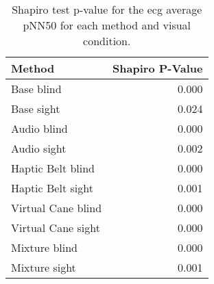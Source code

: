 
\begin{table}[!htb]
\centering
\caption{Shapiro test p-value for the ecg average pNN50 for each method and visual condition.}
\label{tab:shapiro_ecg_pnn50}
\begin{tabular}{lr}
\toprule
            Method &  Shapiro P-Value \\
\midrule
        Base blind &            0.000 \\
        Base sight &            0.024 \\
       Audio blind &            0.000 \\
       Audio sight &            0.002 \\
 Haptic Belt blind &            0.000 \\
 Haptic Belt sight &            0.001 \\
Virtual Cane blind &            0.000 \\
Virtual Cane sight &            0.000 \\
     Mixture blind &            0.000 \\
     Mixture sight &            0.001 \\
\bottomrule
\end{tabular}
\end{table}

